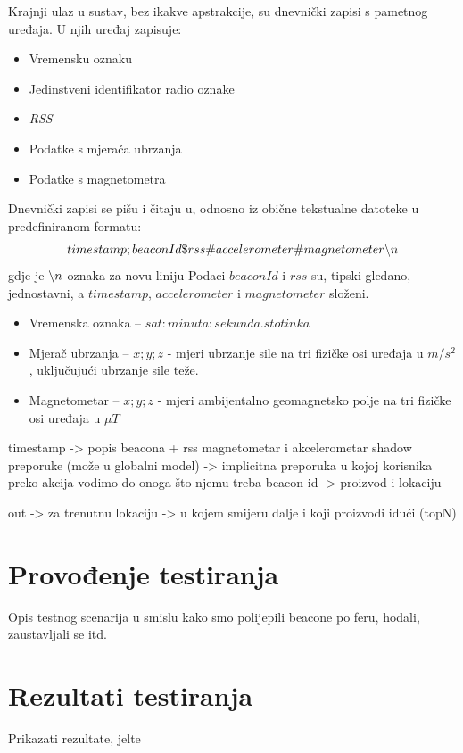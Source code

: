 \documentclass[times, utf8, diplomski, numeric]{fer}
\begin{document}
Krajnji ulaz u sustav, bez ikakve apstrakcije, su dnevnički zapisi  s
pametnog uređaja. U njih uređaj zapisuje:
\begin{itemize}
  \item Vremensku oznaku
  \item Jedinstveni identifikator radio oznake
  \item \emph{RSS} 
  \item Podatke s mjerača ubrzanja 
  \item Podatke s magnetometra 
\end{itemize}
Dnevnički zapisi se pišu i čitaju u, odnosno iz obične tekstualne datoteke u
predefiniranom formatu:
\begin{equation}
	\centering
	timestamp;beaconId\$rss\#accelerometer\#magnetometer\char`\\n
\end{equation}
gdje je $\char`\\n$ oznaka za novu liniju 
Podaci $beaconId$ i $rss$ su, tipski gledano, jednostavni, a $timestamp$,
$accelerometer$ i $magnetometer$ složeni.

\begin{itemize}
  \item Vremenska oznaka -- $sat:minuta:sekunda.stotinka$
  \item Mjerač ubrzanja -- $x;y;z$ - mjeri ubrzanje sile na tri fizičke osi
  uređaja u $m/s^2$, uključujući ubrzanje sile teže.
  \item Magnetometar -- $x;y;z$ - mjeri ambijentalno geomagnetsko polje na tri
  fizičke osi uređaja u $\mu T$
\end{itemize}


timestamp -> popis beacona + rss
magnetometar i akcelerometar
shadow preporuke (može u globalni model) -> implicitna preporuka u kojoj korisnika
preko akcija vodimo do onoga što njemu treba
beacon id -> proizvod i lokaciju

out -> za trenutnu lokaciju -> u kojem smijeru dalje i koji proizvodi idući (topN)

\section{Provođenje testiranja}
Opis testnog scenarija u smislu kako smo polijepili beacone po feru, hodali,
zaustavljali se itd.
\section{Rezultati testiranja}
Prikazati rezultate, jelte
\end{document}
